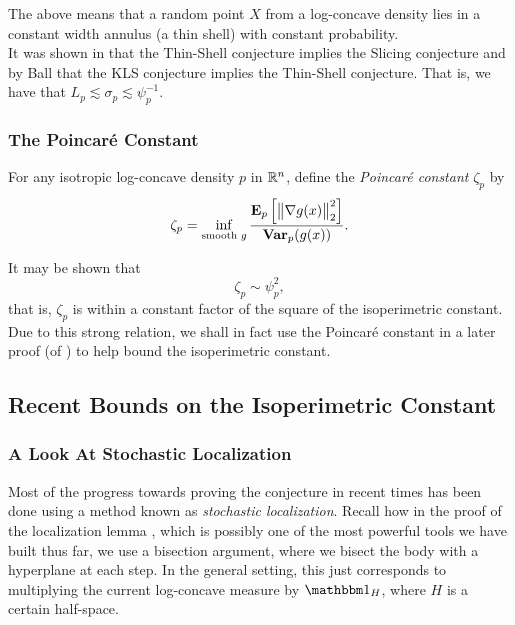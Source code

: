 		The above means that a random point $X$ from a log-concave density lies in a constant width annulus (a thin shell) with constant probability.\\

		It was shown in \cite{Eldan2010ApproximatelyGM} that the Thin-Shell conjecture implies the Slicing conjecture and by Ball that the KLS conjecture implies the Thin-Shell conjecture. That is, we have that $L_p \lesssim \sigma_p \lesssim \psi_p^{-1}$.

	\subsubsection{The Poincar\'{e} Constant}
		\label{sec: poincare constant}

		\begin{fdef}
			For any isotropic log-concave density $p$ in $\mathbb{R}^n$, define the \textit{Poincar\'{e} constant} $\zeta_p$ by
			\[ \zeta_p = \inf_{\text{smooth $g$}} \frac{ \textbf{E}_p \left[\left\lVert\nabla g(x) \right\rVert_2^2\right] }{ \operatorname{\textbf{Var}}_p (g(x)) }. \]
		\end{fdef}

		It may be shown that
		\[ \zeta_p \sim \psi_p^2, \]
		that is, $\zeta_p$ is within a constant factor of the square of the isoperimetric constant. Due to this strong relation, we shall in fact use the Poincar\'{e} constant in a later proof (of ) to help bound the isoperimetric constant.

\subsection{Recent Bounds on the Isoperimetric Constant}

	\subsubsection{A Look At Stochastic Localization}


		Most of the progress towards proving the conjecture in recent times has been done using a method known as \textit{stochastic localization}. Recall how in the proof of the localization lemma , which is possibly one of the most powerful tools we have built thus far, we use a bisection argument, where we bisect the body with a hyperplane at each step. In the general setting, this just corresponds to multiplying the current log-concave measure by $\indic_{H}$, where $H$ is a certain half-space.\\

